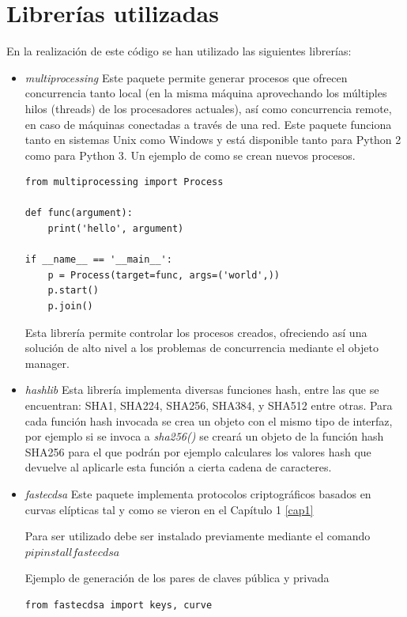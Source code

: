 \section{Librerías utilizadas}
En la realización de este código se han utilizado las siguientes librerías:
\begin{itemize}
\item \textit{multiprocessing}\cite{multiprocessing} Este paquete permite generar procesos que ofrecen concurrencia tanto local (en la misma máquina aprovechando los múltiples hilos (threads) de los procesadores actuales), así como concurrencia remote, en caso de máquinas conectadas a través de una red. Este paquete funciona tanto en sistemas Unix como Windows y está disponible tanto para Python 2 como para Python 3.
Un ejemplo de como se crean nuevos procesos.
\lstset{language=Python}
\lstset{frame=lines}
\lstset{basicstyle=\footnotesize}
\begin{lstlisting}[frame=single]
from multiprocessing import Process

def func(argument):
    print('hello', argument)

if __name__ == '__main__':
    p = Process(target=func, args=('world',))
    p.start()
    p.join()
\end{lstlisting}

Esta librería permite controlar los procesos creados, ofreciendo así una solución de alto nivel a los problemas de concurrencia mediante el objeto manager.

\item \textit{hashlib} \cite{hashlib} Esta librería implementa diversas funciones hash, entre las que se encuentran: SHA1, SHA224, SHA256, SHA384, y SHA512 entre otras. Para cada función hash invocada se crea un objeto con el mismo tipo de interfaz, por ejemplo si se invoca a \textit{sha256()} se creará un objeto de la función hash SHA256 para el que podrán por ejemplo calculares los valores hash que devuelve al aplicarle esta función a cierta cadena de caracteres.

\item \textit{fastecdsa} \cite{fastecdsa} Este paquete implementa protocolos criptográficos basados en curvas elípticas tal y como se vieron en el Capítulo 1 \ref{cap1} 

Para ser utilizado debe ser instalado previamente mediante el comando $pip install fastecdsa$

Ejemplo de generación de los pares de claves pública y privada
\lstset{language=Python}
\lstset{frame=lines}
\lstset{basicstyle=\footnotesize}
\begin{lstlisting}[frame=single]
from fastecdsa import keys, curve


\end{lstlisting}
\end{itemize}
